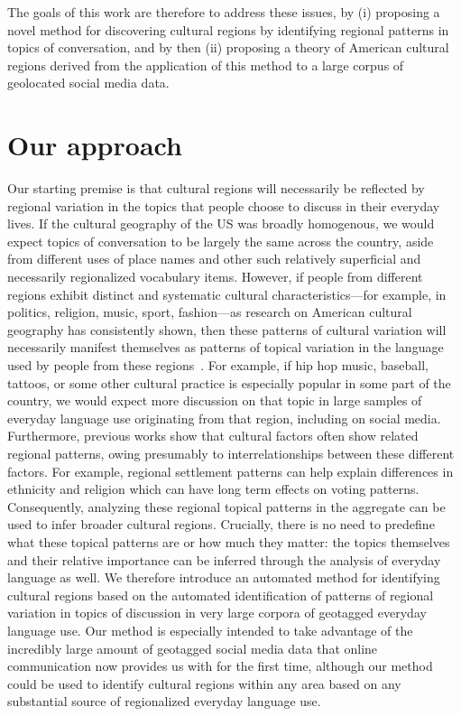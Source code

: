 \documentclass[../thesis.tex]{subfiles}
\begin{document}
The goals of this work are therefore to address these issues, by (i) proposing a novel
method for discovering cultural regions by identifying regional patterns in topics of
conversation, and by then (ii) proposing a theory of American cultural regions derived
from the application of this method to a large corpus of geolocated social media data.


\section{Our approach}
Our starting premise is that cultural regions will necessarily be reflected by regional
variation in the topics that people choose to discuss in their everyday lives. If the
cultural geography of the US was broadly homogenous, we would expect topics of
conversation to be largely the same across the country, aside from different uses of
place names and other such relatively superficial and necessarily regionalized
vocabulary items. However, if  people from different regions exhibit distinct and
systematic cultural characteristics—for example, in politics, religion, music, sport,
fashion—as research on American cultural geography has consistently shown, then these
patterns of cultural variation will necessarily manifest themselves as patterns of
topical variation in the language used by people from these
regions~\cite{kramsch2014language}. For example, if hip hop music,  baseball, tattoos,
or some other cultural practice is especially popular in some part of the country, we
would expect more discussion on that topic in large samples of everyday language use
originating from that region, including on social media. Furthermore, previous works
show that cultural factors often show related regional patterns, owing presumably to
interrelationships between these different factors. For example, regional settlement
patterns can help explain differences in ethnicity and religion which can have long term
effects on voting patterns. Consequently, analyzing these regional topical patterns in
the aggregate can be used to infer broader cultural regions. Crucially, there is no need
to predefine what these topical patterns are or how much they matter: the topics
themselves and their relative importance can be inferred through the analysis of
everyday language as well. We therefore introduce an automated method for identifying
cultural regions based on the automated identification of patterns of regional variation
in topics of discussion in very large corpora of geotagged everyday language use. Our
method is especially intended to take advantage of the incredibly large amount of
geotagged social media data that online communication now provides us with for the first
time, although our method could be used to identify cultural regions within any area
based on any substantial source of regionalized everyday language use.
\end{document}
